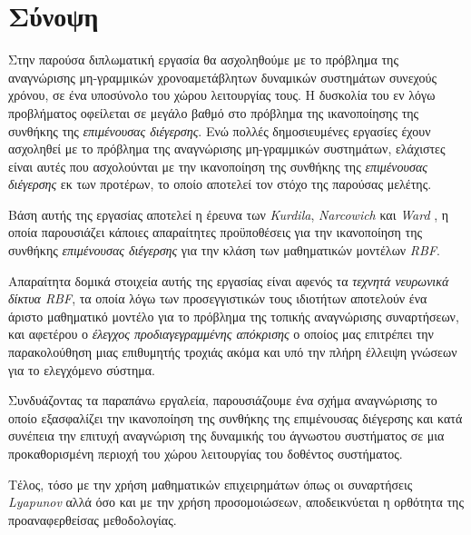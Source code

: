 \chapter*{Σύνοψη}
Στην παρούσα διπλωματική εργασία θα ασχοληθούμε με το πρόβλημα της αναγνώρισης μη-γραμμικών χρονοαμετάβλητων δυναμικών συστημάτων συνεχούς χρόνου, σε ένα υποσύνολο του χώρου λειτουργίας τους. Η δυσκολία του εν λόγω προβλήματος οφείλεται σε μεγάλο βαθμό στο πρόβλημα της ικανοποίησης της συνθήκης της \textit{επιμένουσας διέγερσης}. Ενώ πολλές δημοσιευμένες εργασίες έχουν ασχοληθεί με το πρόβλημα της αναγνώρισης μη-γραμμικών συστημάτων, ελάχιστες είναι αυτές που ασχολούνται με την ικανοποίηση της συνθήκης της \textit{επιμένουσας διέγερσης} εκ των προτέρων, το οποίο αποτελεί τον στόχο της παρούσας μελέτης.

Βάση αυτής της εργασίας αποτελεί η έρευνα των \textit{Kurdila}, \textit{Narcowich} και \textit{Ward} \cite{kurdila1995persistency}, η οποία παρουσιάζει κάποιες απαραίτητες προϋποθέσεις για την ικανοποίηση της συνθήκης \textit{επιμένουσας διέγερσης} για την κλάση των μαθηματικών μοντέλων \textit{RBF}.

Απαραίτητα δομικά στοιχεία αυτής της εργασίας είναι αφενός τα \textit{τεχνητά νευρωνικά δίκτυα RBF}, τα οποία λόγω των προσεγγιστικών τους ιδιοτήτων \cite{park1991universal} αποτελούν ένα άριστο μαθηματικό μοντέλο για το πρόβλημα της τοπικής αναγνώρισης συναρτήσεων, και αφετέρου ο \textit{έλεγχος προδιαγεγραμμένης απόκρισης} \cite{bechlioulis2008robust} ο οποίος μας επιτρέπει την παρακολούθηση μιας επιθυμητής τροχιάς ακόμα και υπό την πλήρη έλλειψη γνώσεων για το ελεγχόμενο σύστημα.

Συνδυάζοντας τα παραπάνω εργαλεία, παρουσιάζουμε ένα σχήμα αναγνώρισης το οποίο εξασφαλίζει την ικανοποίηση της συνθήκης της επιμένουσας διέγερσης και κατά συνέπεια την επιτυχή αναγνώριση της δυναμικής του άγνωστου συστήματος σε μια προκαθορισμένη περιοχή του χώρου λειτουργίας του δοθέντος συστήματος. 

Τέλος, τόσο με την χρήση μαθηματικών επιχειρημάτων όπως οι συναρτήσεις \textit{Lyapunov} αλλά όσο και με την χρήση προσομοιώσεων, αποδεικνύεται η ορθότητα της προαναφερθείσας μεθοδολογίας.




